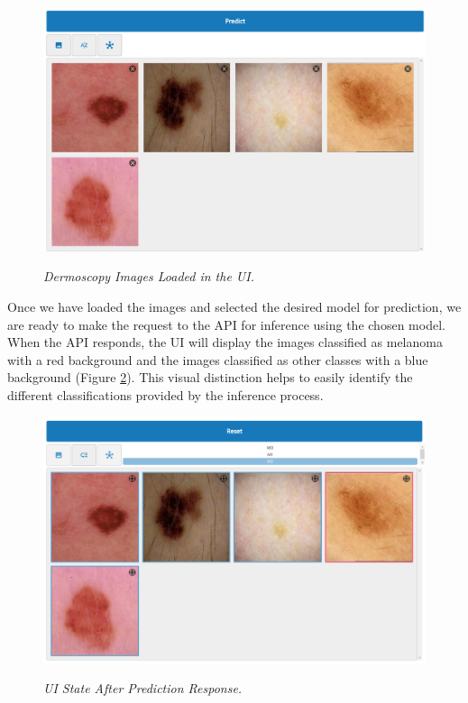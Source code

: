 \begin{figure}[H]
  \centering
  \begin{adjustbox}{width=\textwidth, trim={0cm 3.5cm 0cm 0cm}, clip}
    \includegraphics[width=\textwidth]{imatges/results/loaded-images.png}
  \end{adjustbox}
  \caption[Dermoscopy Images Loaded in the UI]{\textit{Dermoscopy Images Loaded in the UI. }}
  {\label{fig:loaded-images}}
\end{figure}

Once we have loaded the images and selected the desired model for prediction,
we are ready to make the request to the API for inference using the chosen model. When the API responds,
the UI will display the images classified as melanoma with a
red background and the images classified as other classes with a blue background (Figure \ref{fig:after-prediction}).
This visual distinction helps to easily identify the different classifications provided by the inference process.

\begin{figure}[H]
  \centering
  \begin{adjustbox}{width=\textwidth, trim={0cm 3.55cm 0cm 0cm}, clip}
    \includegraphics[width=\textwidth]{imatges/results/after-prediction.png}
  \end{adjustbox}
  \caption[UI State After Prediction Response]{\textit{UI State After Prediction Response. }}
  {\label{fig:after-prediction}}
\end{figure}

